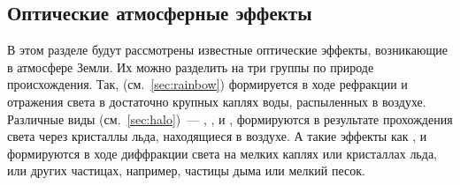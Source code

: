\subsection{Оптические атмосферные эффекты}

В этом разделе будут рассмотрены известные оптические эффекты, возникающие в атмосфере Земли. Их можно разделить на три группы по природе происхождения. Так,  (см.~\ref{sec:rainbow}) формируется в ходе рефракции и отражения света в достаточно крупных каплях воды, распыленных в воздухе. Различные виды  (см.~\ref{sec:halo})~--- , ,  и , формируются в результате прохождения света через кристаллы льда, находящиеся в воздухе. А такие эффекты как ,  и  формируются в ходе  диффракции света на мелких каплях или кристаллах льда, или других частицах, например, частицы дыма или мелкий песок.



